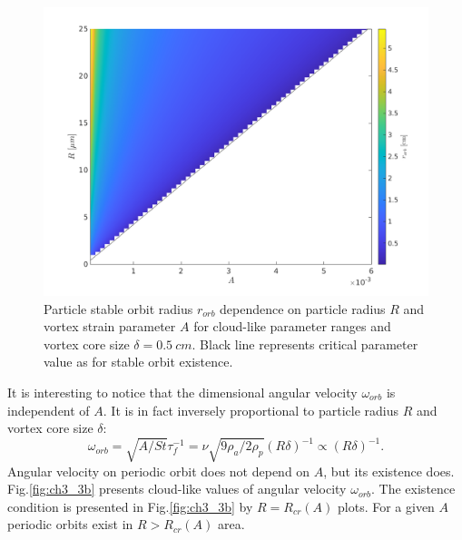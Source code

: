 \documentclass[../main.tex]{subfiles}
\begin{document}
\begin{figure}
\centering
\noindent \includegraphics[width=30pc]{gfx/orbit_vs_R_A_delta05cm.png}
\caption{Particle stable orbit radius $r_{orb}$ dependence on  particle radius $R$ and vortex strain parameter $A$ for cloud-like parameter ranges and vortex core size $\delta=0.5~cm$. Black line represents critical parameter value as for stable orbit existence.}
\label{fig:ch3_3a}
\end{figure}

It is interesting to notice that the dimensional angular velocity $\omega_{orb}$ is independent of $A$. It is in fact inversely proportional to particle radius $R$ and vortex core size $\delta$:
\begin{equation}
\omega_{orb}=\sqrt{A/St} \tau_f^{-1}=\nu \sqrt{9 \rho_a /2 \rho_p} (R \delta)^{-1} \propto (R \delta)^{-1}.
\label{ch3:eq20}
\end{equation}
Angular velocity on periodic orbit does not depend on $A$, but its existence does. Fig.\ref{fig:ch3_3b} presents cloud-like values of angular velocity $\omega_{orb}$. The existence condition is presented in Fig.\ref{fig:ch3_3b} by $R=R_{cr}(A)$ plots. For a given $A$ periodic orbits exist in  $R>R_{cr}(A)$ area.
\end{document}
